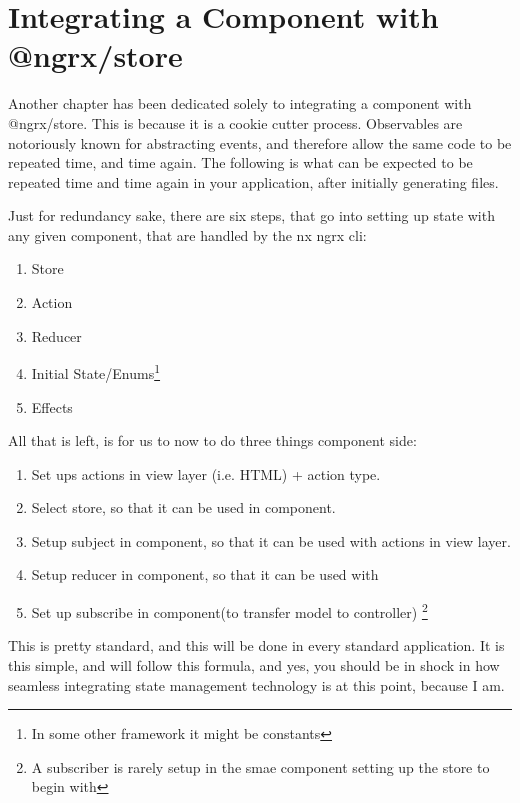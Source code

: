 \maketitle{}
\section{ Integrating a Component with @ngrx/store }

Another chapter has been dedicated solely to integrating a component
with @ngrx/store. This is because it is a cookie cutter process. Observables
are notoriously known for abstracting events, and therefore allow the same
code to be repeated time, and time again. The following is what can be expected
to be repeated time and time again in your application, after initially
generating files.

Just for redundancy sake, there are six steps, that go into setting up state
with any given component, that are handled by the nx ngrx cli:
\begin{enumerate}
  \item Store
  \item Action
  \item Reducer
  \item Initial State/Enums\footnote{In some other framework it might be constants}
  \item Effects
\end{enumerate}

All that is left, is for us to now to do three things component side:

\begin{enumerate}
  \item Set ups actions in view layer (i.e. HTML) + action type.
  \item Select store, so that it can be used in component.
  \item Setup subject in component, so that it can be used with actions in view layer.
  \item Setup reducer in component, so that it can be used with
  \item Set up subscribe in component(to transfer model to controller) \footnote{A subscriber is rarely setup in the smae component setting up the store to begin with}
\end{enumerate}

This is pretty standard, and this will be done in every standard application.
It is this simple, and will follow this formula, and yes, you should be in shock
in how seamless integrating state management technology is at this point,
because I am.


